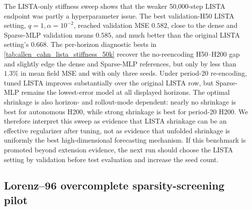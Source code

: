 \begin{table}[t]
  \centering
  \caption{Allen--Cahn 50,000-step LISTA shrinkage/depth diagnostic. The tuned LISTA column reports the best tested LISTA setting for each horizon and rollout mode over \(q\in\{1,2,4\}\) refinement loops and \(\alpha\in\{0,10^{-4},3{\times}10^{-4},10^{-3},3{\times}10^{-3},10^{-2}\}\). Entries are mean held-out field MSE across three seeds; lower is better. Because the best setting is reported separately for each horizon and mode, this table is a diagnostic sweep summary rather than a final validation-selected model claim.}
  \label{tab:allen_cahn_lista_stiffness_50k}
  
\end{table}
The LISTA-only stiffness sweep shows that the weaker 50,000-step LISTA endpoint was partly a hyperparameter issue. The best validation-H50 LISTA setting, \(q=1,\alpha=10^{-2}\), reached validation MSE \(0.582\), close to the dense and Sparse-MLP validation means \(0.585\), and much better than the original LISTA setting's \(0.668\). The per-horizon diagnostic bests in \cref{tab:allen_cahn_lista_stiffness_50k} recover the no-reencoding H50--H200 gap and slightly edge the dense and Sparse-MLP references, but only by less than \(1.3\%\) in mean field MSE and with only three seeds. Under period-20 re-encoding, tuned LISTA improves substantially over the original LISTA row, but Sparse-MLP remains the lowest-error model at all displayed horizons. The optimal shrinkage is also horizon- and rollout-mode dependent: nearly no shrinkage is best for autonomous H200, while strong shrinkage is best for period-20 H200. We therefore interpret this sweep as evidence that LISTA shrinkage can be an effective regularizer after tuning, not as evidence that unfolded shrinkage is uniformly the best high-dimensional forecasting mechanism. If this benchmark is promoted beyond extension evidence, the next run should choose the LISTA setting by validation before test evaluation and increase the seed count.

\subsection{Lorenz--96 overcomplete sparsity-screening pilot}
\label{app:l96_sparsity_screen}

